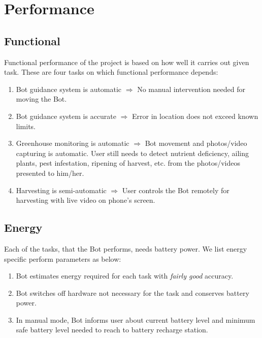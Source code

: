 \documentclass[a4paper, 12pt]{article}
\begin{document}
\section{Performance}
\subsection{Functional}
Functional performance of the project is based on how well it carries out given task. 
These are four tasks on which functional performance depends:
\begin{enumerate}
 \item Bot guidance system is automatic $\Rightarrow$ No manual intervention needed for moving the Bot.
 \item Bot guidance system is accurate $\Rightarrow$ Error in location does not exceed known limits.
 \item Greenhouse monitoring is automatic $\Rightarrow$ Bot movement and photos/video capturing is automatic.
 User still needs to detect nutrient deficiency, ailing plants, pest infestation, ripening of harvest, etc. from
 the photos/videos presented to him/her.
 \item Harvesting is semi-automatic $\Rightarrow$ User controls the Bot remotely for harvesting with live video on phone's screen.
\end{enumerate}

\subsection{Energy}
Each of the tasks, that the Bot performs, needs battery power. We list energy specific perform parameters as below:
\begin{enumerate}
 \item Bot estimates energy required for each task with \emph{fairly good} accuracy.
 \item Bot switches off hardware not necessary for the task and conserves battery power.
 \item In manual mode, Bot informs user about current battery level and minimum safe battery level needed to 
 reach to battery recharge station.
\end{enumerate}


\end{document}
